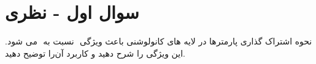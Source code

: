 \section{سوال اول - نظری}

نحوه اشتراک گذاری پارمتر‌ها  در لایه های کانولوشنی باعث ویژگی ‫‪‬‬ نسبت به ‫‪‬‬ می شود. این ویژگی را شرح دهید و کاربرد آن‌را توضیح دهید.

























